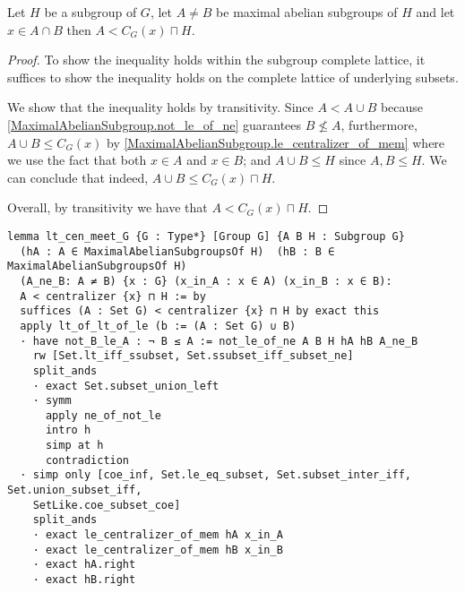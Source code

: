 \begin{lemma}
  \label{MaximalAbelianSubgroup.lt_cen_meet_G}
  \leanok
  Let $H$ be a subgroup of $G$, let $A \ne B$ be maximal abelian subgroups of $H$ and let $x \in A \cap B$ then $A < C_G(x) \sqcap H$.
\end{lemma}
\begin{proof}
  \leanok
  To show the inequality holds within the subgroup complete lattice, 
  it suffices to show the inequality holds on the complete lattice of underlying subsets.
  
  We show that the inequality holds by transitivity. 
  Since $A < A \cup B$ because \ref{MaximalAbelianSubgroup.not_le_of_ne} guarantees $B \not\le A$, 
  furthermore, $A \cup B \le C_G(x)$ by \ref{MaximalAbelianSubgroup.le_centralizer_of_mem} where we use the fact that
  both $x \in A$ and $x \in B$; and $A \cup B \le H$ since  $A, B \le H$. We can conclude that indeed, $A \cup B \le C_G(x) \sqcap H$.
  
  Overall, by transitivity we have that $A < C_G(x) \sqcap H$.

\end{proof}
\begin{footnotesize}
\begin{verbatim}
lemma lt_cen_meet_G {G : Type*} [Group G] {A B H : Subgroup G}
  (hA : A ∈ MaximalAbelianSubgroupsOf H)  (hB : B ∈ MaximalAbelianSubgroupsOf H)
  (A_ne_B: A ≠ B) {x : G} (x_in_A : x ∈ A) (x_in_B : x ∈ B):
  A < centralizer {x} ⊓ H := by
  suffices (A : Set G) < centralizer {x} ⊓ H by exact this
  apply lt_of_lt_of_le (b := (A : Set G) ∪ B)
  · have not_B_le_A : ¬ B ≤ A := not_le_of_ne A B H hA hB A_ne_B
    rw [Set.lt_iff_ssubset, Set.ssubset_iff_subset_ne]
    split_ands
    · exact Set.subset_union_left
    · symm
      apply ne_of_not_le
      intro h
      simp at h
      contradiction
  · simp only [coe_inf, Set.le_eq_subset, Set.subset_inter_iff, Set.union_subset_iff,
    SetLike.coe_subset_coe]
    split_ands
    · exact le_centralizer_of_mem hA x_in_A
    · exact le_centralizer_of_mem hB x_in_B
    · exact hA.right
    · exact hB.right
\end{verbatim}
\end{footnotesize}

